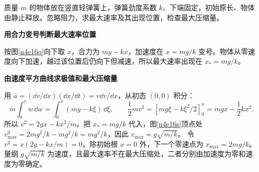 \begin{question}\begin{example}[竖直弹簧压缩过程的最大速率]\label{n4e16}
质量 $m$ 的物体放在竖直轻弹簧上，弹簧劲度系数 $k$、下端固定，初始原长、物体由静止释放。忽略阻力，求最大速率及其出现位置，检查最大压缩量。
\end{example}\end{question}
\begin{solution}\textbf{用合力变号判断最大速率位置}\par\nobreak
按图\ref{n4e16q}向下取 $x$，合力为 $mg-kx$，加速度在 $x=mg/k$ 变号。物体从零速度向下加速，越过该位置后仍向下但减速，所以最大速率出现在 $x_*=mg/k$。


\par\medskip{}\noindent\textbf{由速度平方曲线求极值和最大压缩量}\par\nobreak
用 $a=(\dd v/\dd x)(\dd x/\dd t)=v\dd v/\dd x$，从初态 $(0,0)$ 积分：
\[
m\int_0^v w\,\dd w=\int_0^x(mg-k\xi)\,\dd\xi,
\qquad
\frac12mv^2=[mg\xi-k\xi^2/2]_0^x=mgx-\frac12kx^2.
\]
所以 $v^2=2gx-kx^2/m$。把 $x_*=mg/k$ 代入，图\ref{n4e16s}顶点处
$v_{\max}^2=2mg^2/k-mg^2/k=mg^2/k$，因此 $v_{\max}=g\sqrt{m/k}$。
令 $v^2=x(2g-kx/m)=0$，除初始根 $x=0$ 外，下一个零速点为 $x_{\max}=2mg/k$。量纲 $g\sqrt{m/k}$ 为速度，且最大速率不在最大压缩处，二者分别由加速度为零和速度为零确定。
\end{solution}

